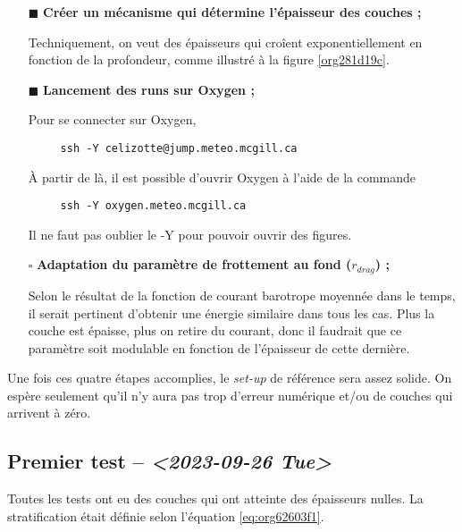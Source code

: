 \documentclass[10pt]{report}
\numberwithin{equation}{section}
\renewcommand{\boxtimes}{\blacksquare}
\begin{document}
\begin{itemize}
\item[{$\boxtimes$}] \textbf{Créer un mécanisme qui détermine l'épaisseur des couches ;}

Techniquement, on veut des épaisseurs qui croîent exponentiellement en fonction de la profondeur, comme illustré à la figure \ref{org281d19c}.
\end{itemize}


\begin{itemize}
\item[{$\boxtimes$}] \textbf{Lancement des runs sur Oxygen ;}

Pour se connecter sur Oxygen,
\begin{verbatim}
     ssh -Y celizotte@jump.meteo.mcgill.ca
\end{verbatim}
À partir de là, il est possible d'ouvrir Oxygen à l'aide de la commande
\begin{verbatim}
     ssh -Y oxygen.meteo.mcgill.ca
\end{verbatim}
Il ne faut pas oublier le -Y pour pouvoir ouvrir des figures.

\item[{$\square$}] \textbf{Adaptation du paramètre de frottement au fond (\(r_{drag}\)) ;}

Selon le résultat de la fonction de courant barotrope moyennée dans le temps, il serait pertinent d'obtenir une énergie similaire dans tous les cas.
Plus la couche est épaisse, plus on retire du courant, donc il faudrait que ce paramètre soit modulable en fonction de l'épaisseur de cette dernière.
\end{itemize}

Une fois ces quatre étapes accomplies, le \emph{set-up} de référence sera assez solide.
On espère seulement qu'il n'y aura pas trop d'erreur numérique et/ou de couches qui arrivent à zéro.

\subsection{Premier test -- \textit{<2023-09-26 Tue>}}
\label{sec:orge31fb11}

Toutes les tests ont eu des couches qui ont atteinte des épaisseurs nulles.
La stratification était définie selon l'équation \ref{eq:org62603f1}.
\end{document}
